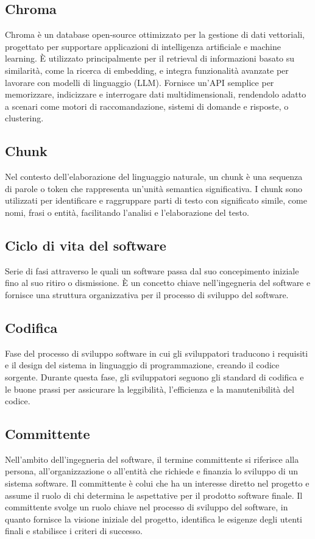 \hypertarget{sec:chroma}{}
\subsection*{Chroma}
Chroma è un database open-source ottimizzato per la gestione di dati vettoriali, progettato per supportare applicazioni di intelligenza artificiale e 
machine learning. È utilizzato principalmente per il retrieval di informazioni basato su similarità, come la ricerca di embedding, e integra funzionalità 
avanzate per lavorare con modelli di linguaggio (LLM). Fornisce un'API semplice per memorizzare, indicizzare e interrogare dati multidimensionali, 
rendendolo adatto a scenari come motori di raccomandazione, sistemi di domande e risposte, o clustering.

\hypertarget{sec:chunk}{}
\subsection*{Chunk}
Nel contesto dell'elaborazione del linguaggio naturale, un chunk è una sequenza di parole o token che rappresenta un'unità semantica significativa.
I chunk sono utilizzati per identificare e raggruppare parti di testo con significato simile, come nomi, frasi o entità, facilitando l'analisi e l'elaborazione
del testo.

\hypertarget{sec:ciclo_di_vita}{}
\subsection*{Ciclo di vita del software}
Serie di fasi attraverso le quali un software passa dal suo concepimento iniziale fino al suo ritiro o dismissione. È un concetto chiave nell'ingegneria 
del software e fornisce una struttura organizzativa per il processo di sviluppo del software.

\hypertarget{sec:codifica}{}
\subsection*{Codifica}
Fase del processo di sviluppo software in cui gli sviluppatori traducono i requisiti e il design del sistema in linguaggio di programmazione, creando il 
codice sorgente. Durante questa fase, gli sviluppatori seguono gli standard di codifica e le buone prassi per assicurare la leggibilità, l’efficienza e la 
manutenibilità del codice.

\hypertarget{sec:committente}{}
\subsection*{Committente}
Nell’ambito dell’ingegneria del software, il termine committente si riferisce alla persona, all’organizzazione o all’entità che richiede e 
finanzia lo sviluppo di un sistema software. Il committente è colui che ha un interesse diretto nel progetto e assume il ruolo
di chi determina le aspettative per il prodotto software finale. Il committente svolge un ruolo chiave nel processo di sviluppo del software, 
in quanto fornisce la visione iniziale del progetto, identifica le esigenze degli utenti finali e stabilisce i criteri di successo.

